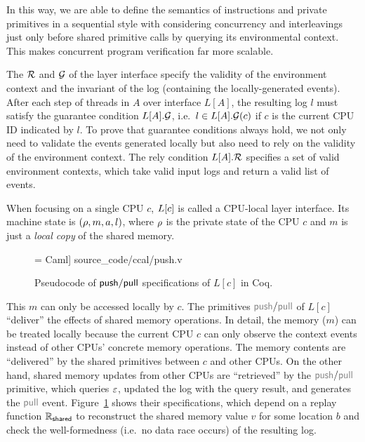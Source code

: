 In this way, we are able to define the semantics of instructions
and private primitives in a sequential style 
with considering concurrency
and interleavings  just only before 
shared primitive calls by querying its environmental context.
This makes concurrent program verification far more scalable.

The $\mathcal{R}$ and $\mathcal{G}$ of the layer interface specify the validity of the environment context and the invariant of the log (containing the locally-generated events).
After each step of threads in $A$ over interface $L[A]$, 
the resulting log $l$  must satisfy the guarantee condition $L[A].\mathcal{G}$, i.e.\, $l \in L[A].\mathcal{G}(c)$ if $c$ is the current CPU ID indicated by $l$. 
To prove that
 guarantee conditions always hold,  we not only need to validate the events generated locally
but also need to rely on the validity of the environment context. The rely condition $L[A].\mathcal{R}$ specifies a set of
valid environment contexts, which take valid input logs
and return a valid list of events.

When focusing on a single CPU $c$, $L[c]$ is called 
a CPU-local layer interface.
Its machine state is $(\rho, m, a, l)$,
where $\rho$ is the private state of the CPU $c$
and $m$ is just a \emph{local copy} of the shared memory.

\begin{figure}[t]
 = Caml] {source_code/ccal/push.v}
\caption{Pseudocode of $\mathsf{push}/\mathsf{pull}$ specifications of $L[c]$ in Coq.}
\label{fig:exp:pull}
\end{figure}


This $m$ can only be accessed locally by $c$. The primitives $\cpush/\cpull$ of
$L[c]$  ``deliver'' the effects of shared memory operations.
In detail, the memory ($m$) can be treated locally
because the current CPU $c$ can only observe 
the context events instead of other CPUs'  concrete memory
operations. The memory contents are ``delivered''  by the  shared primitives
between $c$ and other CPUs.
On the other hand, 
shared memory updates from other CPUs are ``retrieved'' by the $\cpush/\cpull$ primitive, 
which  queries $\oracle$, updated the log
with the query result, and generates the $\cpull$ event.
Figure~\ref{fig:exp:pull} shows their specifications, which depend on
a replay function  $\mathbb{R}_{\mathsf{\textcolor{black}{shared}}}$ to
reconstruct the shared memory value $v$ for some location $b$ and check the well-formedness (i.e.\, no data race occurs)
of the resulting log.

